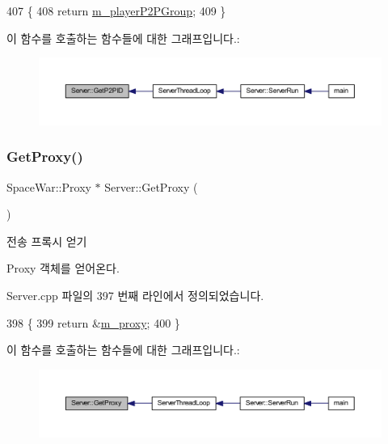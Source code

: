 \begin{DoxyCode}
407 \{
408     \textcolor{keywordflow}{return} \hyperlink{class_server_a8f7f03253584e9db740a5f9f97ff1fc5}{m\_playerP2PGroup};
409 \}
\end{DoxyCode}
이 함수를 호출하는 함수들에 대한 그래프입니다.\+:\nopagebreak
\begin{figure}[H]
\begin{center}
\leavevmode
\includegraphics[width=350pt]{class_server_ac6e03fa95f91583bd117f4910257b7be_icgraph}
\end{center}
\end{figure}
\mbox{\label{class_server_ae62a9437703d205c2d02737dfce45a33}} 
\subsubsection{\texorpdfstring{Get\+Proxy()}{GetProxy()}}
{\footnotesize\ttfamily Space\+War\+::\+Proxy $\ast$ Server\+::\+Get\+Proxy (\begin{DoxyParamCaption}{ }\end{DoxyParamCaption})}



전송 프록시 얻기 

Proxy 객체를 얻어온다. 

Server.\+cpp 파일의 397 번째 라인에서 정의되었습니다.


\begin{DoxyCode}
398 \{
399     \textcolor{keywordflow}{return} &\hyperlink{class_server_adbe7ca5dd78f70ef2771eb1724b397de}{m\_proxy};
400 \}
\end{DoxyCode}
이 함수를 호출하는 함수들에 대한 그래프입니다.\+:\nopagebreak
\begin{figure}[H]
\begin{center}
\leavevmode
\includegraphics[width=350pt]{class_server_ae62a9437703d205c2d02737dfce45a33_icgraph}
\end{center}
\end{figure}
\mbox{\label{class_server_a044bc662d96361b3bda25230533ec63b}} 
